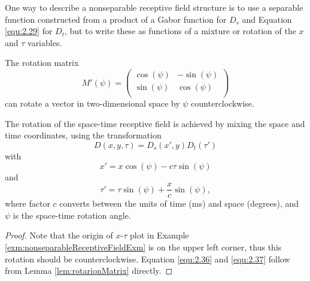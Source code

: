 \begin{rem}
  One way to describe a nonseparable receptive field structure is to use a separable function constructed from a product of a Gabor function for $D_s$ and Equation \ref{equ:2.29} for $D_t$, but to write these as functions of a mixture or rotation of the $x$ and $\tau$ variables.
\end{rem}

\begin{lem}
  \label{lem:rotarionMatrix}
  The rotation matrix
  \begin{equation}
    \label{equ:rotationMatrix}
    M'(\psi) = \left(
      \begin{matrix}
        \cos(\psi) & -\sin(\psi) \\
        \sin(\psi) & \cos(\psi) \\
      \end{matrix}
    \right)
  \end{equation}
  can rotate a vector in two-dimensional space by $\psi$ counterclockwise.
\end{lem}

\begin{prop}
  The rotation of the space-time receptive field is achieved by mixing the space and time coordinates, using the transformation
  \begin{equation}
    \label{equ:2.35}
    D(x,y,\tau) = D_s(x',y)D_t(\tau')
  \end{equation}
  with
  \begin{equation}
    \label{equ:2.36}
    x' = x\cos(\psi) - c\tau\sin(\psi)
  \end{equation}
  and
  \begin{equation}
    \label{equ:2.37}
    \tau' = \tau\sin(\psi) + \frac{x}{c}\sin(\psi),
  \end{equation}
  where factor $c$ converts between the units of time (ms) and space (degrees), and $\psi$ is the space-time rotation angle.
\end{prop}
\begin{proof}
  Note that the origin of $x$-$\tau$ plot in Example \ref{exm:nonseparableReceptiveFieldExm} is on the upper left corner, thus this rotation should be counterclockwise. Equation \ref{equ:2.36} and \ref{equ:2.37} follow from Lemma \ref{lem:rotarionMatrix} directly.
\end{proof}

